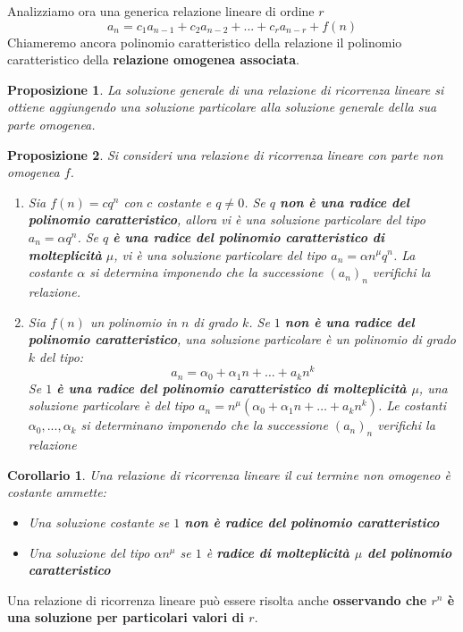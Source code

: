 \documentclass[12pt]{article}
\newtheorem{Corollario}{Corollario}[subsection]
\newtheorem{Proposizione}{Proposizione}[subsection]
\begin{document}
Analizziamo ora una generica relazione lineare di ordine $r$
$$a_n = c_1a_{n-1} + c_2a_{n-2} + ... + c_ra_{n-r} + f(n)$$
Chiameremo ancora polinomio caratteristico della relazione il polinomio caratteristico della \textbf{relazione omogenea associata}.
\begin{Proposizione}
    La soluzione generale di una relazione di ricorrenza lineare si ottiene aggiungendo una soluzione particolare alla soluzione generale della sua parte omogenea.
\end{Proposizione}
\begin{Proposizione}
    Si consideri una relazione di ricorrenza lineare con parte non omogenea $f$.
    \begin{enumerate}
        \item Sia $f(n) = cq^n$ con $c$ costante e $q \neq 0$. Se $q$ \textbf{non è una radice del polinomio caratteristico}, allora vi è una
        soluzione particolare del tipo $a_n = \alpha q^n$. Se $q$ \textbf{è una radice del polinomio caratteristico di molteplicità} $\mu$, vi è una
        soluzione particolare del tipo $a_n = \alpha n^\mu q^n$. La costante $\alpha$ si determina imponendo che la successione $(a_n)_n$ verifichi la relazione.
        \item Sia $f(n)$ un polinomio in $n$ di grado $k$. Se $1$ \textbf{non è una radice del polinomio caratteristico}, una soluzione particolare è un polinomio di grado $k$ del tipo:
        $$a_n = \alpha_0 + \alpha_1 n + \dots + a_k n^k$$
        Se $1$ \textbf{è una radice del polinomio caratteristico di molteplicità $\mu$}, una soluzione particolare è del tipo $a_n = n^\mu(\alpha_0 + \alpha_1 n + \dots + a_k n^k)$.
        Le costanti $\alpha_0, ..., \alpha_k$ si determinano imponendo che la successione $(a_n)_n$ verifichi la relazione
    \end{enumerate}
\end{Proposizione}
\begin{Corollario}
    Una relazione di ricorrenza lineare il cui termine non omogeneo è costante ammette:
    \begin{itemize}
        \item Una soluzione costante se $1$ \textbf{non è radice del polinomio caratteristico}
        \item Una soluzione del tipo $\alpha n^\mu$ se $1$ è \textbf{radice di molteplicità $\mu$ del polinomio caratteristico}
    \end{itemize}
\end{Corollario}
Una relazione di ricorrenza lineare può essere risolta anche \textbf{osservando che $r^n$ è una soluzione per particolari valori di $r$}.
\end{document}
